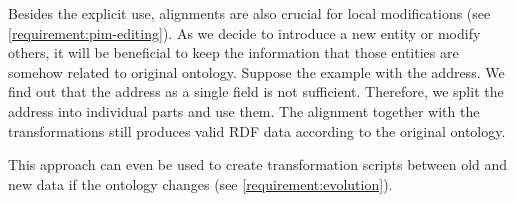Besides the explicit use, alignments are also crucial for local modifications (see \autoref{requirement:pim-editing}). As we decide to introduce a new entity or modify others, it will be beneficial to keep the information that those entities are somehow related to original ontology. Suppose the example with the address. We find out that the address as a single field is not sufficient. Therefore, we split the address into individual parts and use them. The alignment together with the transformations still produces valid RDF data according to the original ontology.

This approach can even be used to create transformation scripts between old and new data if the ontology changes (see \autoref{requirement:evolution}). %

